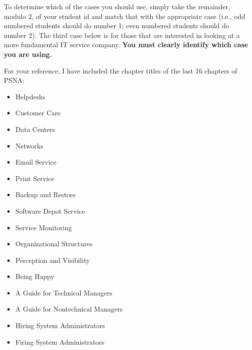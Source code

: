 \documentclass{exam}
\begin{document}
\begin{questions}
To determine which of the cases you should use, simply take the remainder,
modulo 2, of your student id and match that with the appropriate case (i.e.,
odd numbered students should do number 1; even numbered students should
do number 2).  The third case below is for those that are interested 
in looking at a more fundamental IT service company.  {\bf You must
clearly identify which case you are using.}

For your reference, I have included the chapter titles of the last
16 chapters of PSNA:

\begin{comment}
\begin{enumerate}
\item Desktops
\item Servers
\item Services
\item Debugging
\item Fixing Things Once
\item Namespaces
\item Security Policy
\item Disaster Recover and Data Integrity
\item Ethics
\item Change Management and Revision Control
\item Server upgrades
\item Maintenance Windows
\item Service Conversions
\item Centralization and Decentralization
\end{enumerate}
\end{comment}

\begin{itemize}
\item Helpdesks
\item Customer Care
\item Data Centers
\item Networks
\item Email Service
\item Print Service
\item Backup and Restore
\item Software Depot Service
\item Service Monitoring
\item Organizational Structures
\item Perception and Visibility
\item Being Happy
\item A Guide for Technical Managers
\item A Guide for Nontechnical Managers
\item Hiring System Administrators
\item Firing  System Administrators
\end{itemize}


\end{questions}
\end{document}
